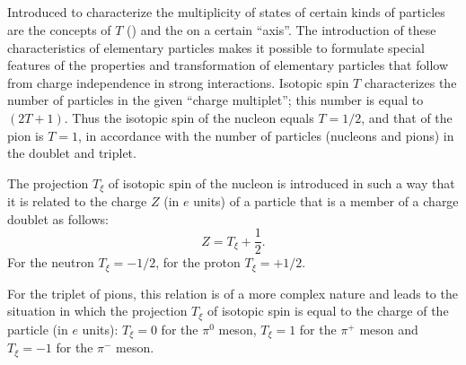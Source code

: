 \subsection{}\label{43.4.2} Introduced to characterize the multiplicity of states of certain kinds of particles are the concepts of  $T$ () and the  on a certain ``axis''. The introduction of these characteristics of elementary particles makes it possible to formulate special features of the properties and transformation of elementary particles that follow from charge independence in strong interactions. Isotopic spin $T$ characterizes the number of particles in the given ``charge multiplet''; this number is equal to $(2T + 1)$. Thus the isotopic spin of the nucleon equals $T = 1/2$, and that of the pion is $T = 1$, in accordance with the number of particles (nucleons and pions) in the doublet and triplet.

The projection $T_{\xi}$ of isotopic spin of the nucleon is introduced in such a way that it is related to the charge $Z$ (in $e$ units) of a particle that is a member of a charge doublet as follows:
\begin{equation*}%
Z = T_{\xi} + \frac{1}{2}.
\end{equation*}
For the neutron $T_{\xi} = -1/2$, for the proton $T_{\xi} = +1/2$.

For the triplet of pions, this relation is of a more complex nature  and leads to the situation in which the projection $T_{\xi}$ of isotopic spin is equal to the charge of the particle (in $e$ units):
$T_{\xi} = 0$ for the $\pi^{0}$ meson, $T_{\xi} = 1$ for the $\pi^{+}$ meson and $T_{\xi}= -1$ for the $\pi^{-}$ meson.

